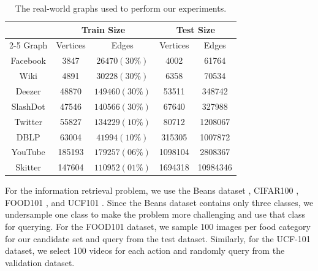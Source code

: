 \begin{table}[h]
\centering
\caption{The real-world graphs used to perform our experiments. 
}

\vspace{1em}
\begin{tabular}{|c|c|c|c|c|}
\hline
         & \multicolumn{2}{c|}{Train Size}        & \multicolumn{2}{c|}{Test Size}           \\ \cline{2-5} 
Graph    & \multicolumn{1}{c|}{Vertices} & Edges  & \multicolumn{1}{c|}{Vertices} & Edges    \\ \hline
Facebook & 3847                          & $26470 (30\%)$  & 4002                          & 61764    \\
Wiki     & 4891                          & $30228 (30\%)$  & 6358                          & 70534    \\
Deezer   & 48870                         & $149460 (30\%)$& 53511                         & 348742   \\
SlashDot & 47546                         & $140566 (30\%)$& 67640                         & 327988   \\
Twitter  & 55827                         & $134229 (10\%)$& 80712                         & 1208067  \\
DBLP     & 63004                         & $41994 (10\%)$ & 315305                        & 1007872  \\
YouTube  & 185193                        & $179257 (06\%)$ & 1098104                       & 2808367  \\
Skitter  & 147604                        & $110952 (01\%)$ & 1694318                       & 10984346 \\ \hline
\end{tabular}

\label{tab:dataset_distribution}
\end{table}


For the information retrieval problem, we use the Beans dataset \citep{beansdata}, CIFAR100 \citep{Krizhevsky09learningmultiple}, FOOD101 \citep{bossard14}, and UCF101 \citep{soomro2012ucf101dataset101human}. Since the Beans dataset contains only three classes, we undersample one class to make the problem more challenging and use that class for querying. For the FOOD101 dataset, we sample 100 images per food category for our candidate set and query from the test dataset. Similarly, for the UCF-101 dataset, we select 100 videos for each action and randomly query from the validation dataset.






